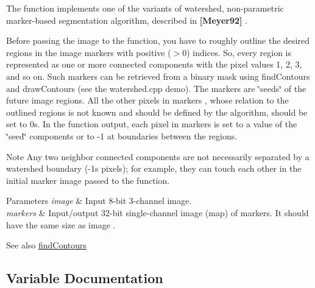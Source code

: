 The function implements one of the variants of watershed, non-\/parametric marker-\/based segmentation algorithm, described in {\bfseries [Meyer92]} . 

Before passing the image to the function, you have to roughly outline the desired regions in the image markers with positive ($>$0) indices. So, every region is represented as one or more connected components with the pixel values 1, 2, 3, and so on. Such markers can be retrieved from a binary mask using find\+Contours and draw\+Contours (see the watershed.\+cpp demo). The markers are \char`\"{}seeds\char`\"{} of the future image regions. All the other pixels in markers , whose relation to the outlined regions is not known and should be defined by the algorithm, should be set to 0\textquotesingle{}s. In the function output, each pixel in markers is set to a value of the \char`\"{}seed\char`\"{} components or to -\/1 at boundaries between the regions. 

\begin{DoxyNote}{Note}
Any two neighbor connected components are not necessarily separated by a watershed boundary (-\/1\textquotesingle{}s pixels); for example, they can touch each other in the initial marker image passed to the function. 
\end{DoxyNote}

\begin{DoxyParams}{Parameters}
{\em image} & Input 8-\/bit 3-\/channel image. \\
\hline
{\em markers} & Input/output 32-\/bit single-\/channel image (map) of markers. It should have the same size as image . \\
\hline
\end{DoxyParams}
\begin{DoxySeeAlso}{See also}
\hyperlink{group__imgproc__shape_gad95c6aa001eb4a24cc898ff08dcb81da}{find\+Contours} 
\end{DoxySeeAlso}


\subsection{Variable Documentation}
\mbox{\label{group__imgproc__misc_gaa22bea46672d18b28cbb5f9ec927fca9}} 
